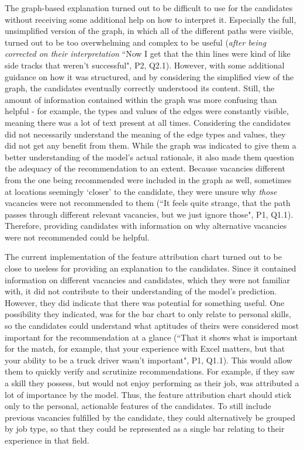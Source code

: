 The graph-based explanation turned out to be difficult to use for the candidates without receiving some additional help on how to interpret it. Especially the full, unsimplified version of the graph, in which all of the different paths were visible, turned out to be too overwhelming and complex to be useful (\textit{after being corrected on their interpretation} ``Now I get that the thin lines were kind of like side tracks that weren't successful", P2, Q2.1). However, with some additional guidance on how it was structured, and by considering the simplified view of the graph, the candidates eventually correctly understood its content. Still, the amount of information contained within the graph was more confusing than helpful - for example, the types and values of the edges were constantly visible, meaning there was a lot of text present at all times. Considering the candidates did not necessarily understand the meaning of the edge types and values, they did not get any benefit from them. While the graph was indicated to give them a better understanding of the model's actual rationale, it also made them question the adequacy of the recommendation to an extent. Because vacancies different from the one being recommended were included in the graph as well, sometimes at locations seemingly `closer' to the candidate, they were unsure why \emph{those} vacancies were not recommended to them (``It feels quite strange, that the path passes through different relevant vacancies, but we just ignore those", P1, Q1.1). Therefore, providing candidates with information on why alternative vacancies were not recommended could be helpful. 

The current implementation of the feature attribution chart turned out to be close to useless for providing an explanation to the candidates. Since it contained information on different vacancies and candidates, which they were not familiar with, it did not contribute to their understanding of the model's prediction. However, they did indicate that there was potential for something useful. One possibility they indicated, was for the bar chart to only relate to personal skills, so the candidates could understand what aptitudes of theirs were considered most important for the recommendation at a glance (``That it shows what is important for the match, for example, that your experience with Excel matters, but that your ability to be a truck driver wasn't important", P1, Q1.1). This would allow them to quickly verify and scrutinize recommendations. For example, if they saw a skill they possess, but would not enjoy performing as their job, was attributed a lot of importance by the model. Thus, the feature attribution chart should stick only to the personal, actionable features of the candidates. To still include previous vacancies fulfilled by the candidate, they could alternatively be grouped by job type, so that they could be represented as a single bar relating to their experience in that field. 


